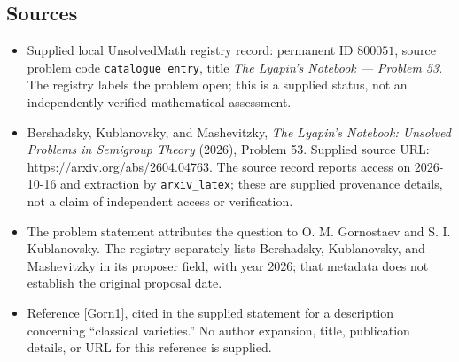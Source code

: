 \documentclass[11pt]{article}
\begin{document}
\subsection{Sources}
\begin{itemize}
\item Supplied local UnsolvedMath registry record: permanent ID \(800051\), source problem code \texttt{catalogue entry}, title \emph{The Lyapin's Notebook --- Problem 53}. The registry labels the problem open; this is a supplied status, not an independently verified mathematical assessment.
\item Bershadsky, Kublanovsky, and Mashevitzky, \emph{The Lyapin's Notebook: Unsolved Problems in Semigroup Theory} (2026), Problem 53. Supplied source URL: \url{https://arxiv.org/abs/2604.04763}. The source record reports access on 2026-10-16 and extraction by \texttt{arxiv\_latex}; these are supplied provenance details, not a claim of independent access or verification.
\item The problem statement attributes the question to O. M. Gornostaev and S. I. Kublanovsky. The registry separately lists Bershadsky, Kublanovsky, and Mashevitzky in its proposer field, with year 2026; that metadata does not establish the original proposal date.
\item Reference [Gorn1], cited in the supplied statement for a description concerning ``classical varieties.'' No author expansion, title, publication details, or URL for this reference is supplied.
\end{itemize}
\end{document}
